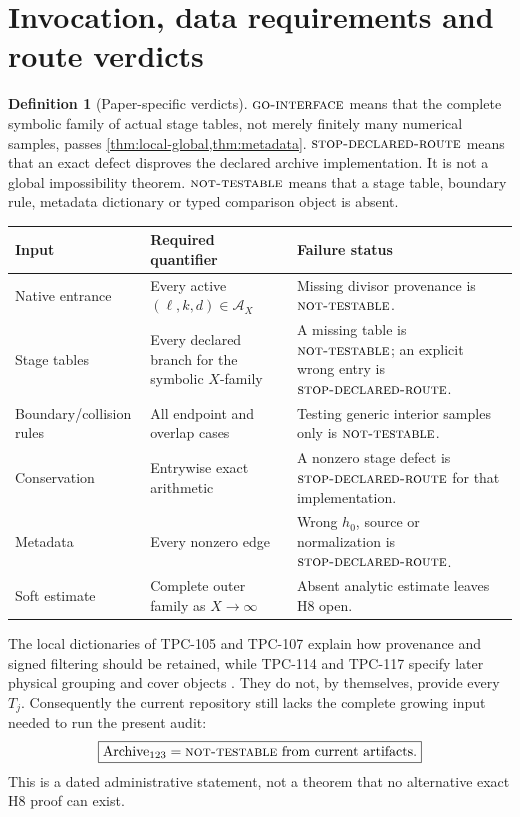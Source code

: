\documentclass[11pt]{article}
\theoremstyle{definition}
\newtheorem{definition}[theorem]{Definition}
\theoremstyle{remark}
\newcommand{\cA}{\mathcal A}
\newcommand{\GOI}{\textsc{go-interface}}
\newcommand{\STOP}{\textsc{stop-declared-route}}
\newcommand{\NT}{\textsc{not-testable}}
\begin{document}
\section{Invocation, data requirements and route verdicts}

\begin{definition}[Paper-specific verdicts]
\(\GOI\) means that the complete symbolic family of actual stage
tables, not merely finitely many numerical samples, passes
\cref{thm:local-global,thm:metadata}.  \(\STOP\) means that an exact
defect disproves the declared archive implementation.  It is not a
global impossibility theorem.  \(\NT\) means that a stage table,
boundary rule, metadata dictionary or typed comparison object is
absent.
\end{definition}

\begin{center}
\small
\begin{tabularx}{\textwidth}{@{}P{0.25\textwidth}P{0.28\textwidth}Y@{}}
\toprule
Input & Required quantifier & Failure status\\
\midrule
Native entrance
& Every active \((\ell,k,d)\in\cA_X\)
& Missing divisor provenance is \(\NT\).\\
Stage tables
& Every declared branch for the symbolic \(X\)-family
& A missing table is \(\NT\); an explicit wrong entry is \(\STOP\).\\
Boundary/collision rules
& All endpoint and overlap cases
& Testing generic interior samples only is \(\NT\).\\
Conservation
& Entrywise exact arithmetic
& A nonzero stage defect is \(\STOP\) for that implementation.\\
Metadata
& Every nonzero edge
& Wrong \(h_0\), source or normalization is \(\STOP\).\\
Soft estimate
& Complete outer family as \(X\to\infty\)
& Absent analytic estimate leaves H8 open.\\
\bottomrule
\end{tabularx}
\end{center}

The local dictionaries of TPC-105 and TPC-107 explain how provenance
and signed filtering should be retained, while TPC-114 and TPC-117
specify later physical grouping and cover objects
\citep{WangTPC105,WangTPC107,WangTPC114,WangTPC117}.  They do not,
by themselves, provide every \(T_j\).  Consequently the current
repository still lacks the complete growing input needed to run the
present audit:
\[
 \boxed{
 \operatorname{Archive}_{123}
 =
 \NT\ \text{from current artifacts}.}
\]
This is a dated administrative statement, not a theorem that no
alternative exact H8 proof can exist.
\end{document}
